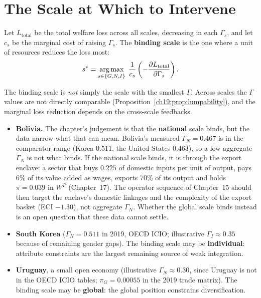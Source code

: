 \documentclass[../structural_economics_book.tex]{subfiles}
\begin{document}
\section{The Scale at Which to Intervene}
\label{ch19:sec:intervention}

\begin{definition}\label{ch19:prop:binding}
Let $L_{\text{total}}$ be the total welfare loss across all scales, decreasing in each $\Gamma_s$, and let $c_s$ be the marginal cost of raising $\Gamma_s$. The \textbf{binding scale} is the one where a unit of resources reduces the loss most:
\begin{equation}\label{ch19:eq:binding}
s^* = \operatorname*{arg\,max}_{s \in \{G, N, I\}} \; \frac{1}{c_s}\left(-\frac{\partial L_{\text{total}}}{\partial \Gamma_s}\right).
\end{equation}
\end{definition}

The binding scale is \emph{not} simply the scale with the smallest $\Gamma$. Across scales the $\Gamma$ values are not directly comparable (Proposition~\ref{ch19:prop:lumpability}), and the marginal loss reduction depends on the cross-scale feedbacks.

\begin{remark}
\begin{itemize}
\item \textbf{Bolivia.} The chapter's judgement is that the \textbf{national} scale binds, but the data narrow what that can mean. Bolivia's measured $\Gamma_N = 0.467$ is in the comparator range (Korea $0.511$, the United States $0.463$), so a low aggregate $\Gamma_N$ is not what binds. If the national scale binds, it is through the export enclave: a sector that buys $0.225$ of domestic inputs per unit of output, pays 6\% of its value added as wages, exports 70\% of its output and holds $\pi = 0.039$ in $W^P$ (Chapter~17). The operator sequence of Chapter~15 should then target the enclave's domestic linkages and the complexity of the export basket (ECI $-1.30$), not aggregate $\Gamma_N$. Whether the global scale binds instead is an open question that these data cannot settle.
\item \textbf{South Korea} ($\Gamma_N = 0.511$ in 2019, OECD ICIO; illustrative $\Gamma_I \approx 0.35$ because of remaining gender gaps). The binding scale may be \textbf{individual}: attribute constraints are the largest remaining source of weak integration.
\item \textbf{Uruguay}, a small open economy (illustrative $\Gamma_N \approx 0.30$, since Uruguay is not in the OECD ICIO tables; $\pi_G = 0.00055$ in the 2019 trade matrix). The binding scale may be \textbf{global}: the global position constrains diversification.
\end{itemize}
\end{remark}
\end{document}
